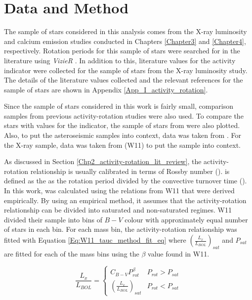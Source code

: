 \section{Data and Method}
\label{Chp5_data_and_method}

The sample of stars considered in this analysis comes from the X-ray luminosity and calcium emission studies conducted in Chapters \ref{Chapter3} and \ref{Chapter4}, respectively. Rotation periods for this sample of stars were searched for in the literature using \textit{VizieR} \citep{Ochsenbein_etal_2000}. In addition to this, literature values for the \Rprime activity indicator were collected for the sample of stars from the X-ray luminosity study. The details of the literature values collected and the relevant references for the sample of stars are shown in Appendix \ref{App_I_activity_rotation}.

Since the sample of stars considered in this work is fairly small, comparison samples from previous activity-rotation studies were also used. To compare the stars with values for the \Rprime indicator, the sample of stars from \citet{Metcalfe_etal_2016} were also plotted. Also, to put the asteroseismic samples into context, data was taken from \citet{Baliunas_etal_1996}. For the X-ray sample, data was taken from \citet{Wright_etal_2011} (W11) to put the sample into context.

As discussed in Section \ref{Chp2_activity-rotation_lit_review}, the activity-rotation relationship is usually calibrated in terms of Rossby number (\Ro). \Ro is defined as the as the rotation period divided by the convective turnover time (\tauc). In this work, \tauc was calculated using the relations from W11 that were derived empirically. By using an empirical method, it assumes that the activity-rotation relationship can be divided into saturated and non-saturated regimes. W11 divided their sample into bins of $B-V$ colour with approximately equal number of stars in each bin. For each mass bin, the activity-rotation relationship was fitted with Equation \ref{Eq:W11_tauc_method_fit_eq} where $(\frac{L_{x}}{L_{BOL}})_{sat}$ and $P_{sat}$ are fitted for each of the mass bins using the $\beta$ value found in W11.

\begin{equation}
    \frac{L_{x}}{L_{BOL}} = 
    \begin{cases}
        C_{B-V}P_{rot}^{\beta} & P_{rot} > P_{sat} \\
        (\frac{L_{x}}{L_{BOL}})_{sat} & P_{rot} < P_{sat}
    \end{cases}
    \label{Eq:W11_tauc_method_fit_eq}
\end{equation}

